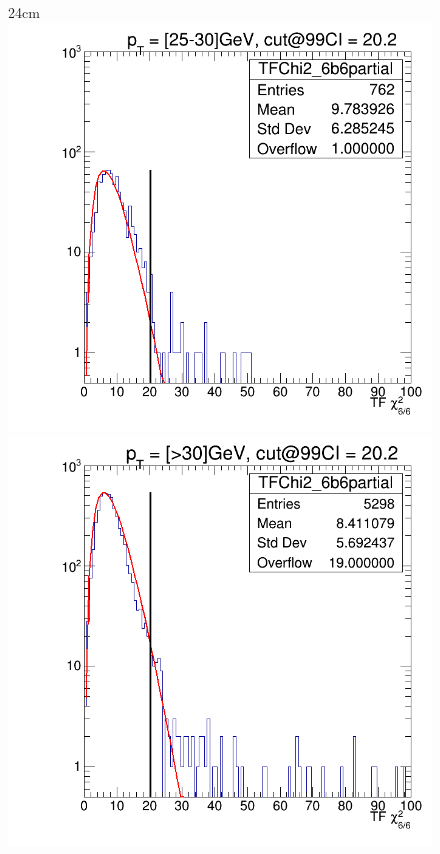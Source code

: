 \begin{landscape}
\begin{figure}[htbp]{24cm}
	\includegraphics[scale=0.25,trim={1cm 0cm 1cm 0cm},clip]{AppendixCMSL1TT/figs/chi2_6b6_25to30_99cut}	
	\includegraphics[scale=0.25,trim={1cm 0cm 1cm 0cm},clip]{AppendixCMSL1TT/figs/chi2_6b6_30toInf_99cut}
	\label{fig:6b6_chi2_pt}	
\end{figure}
\end{landscape}

